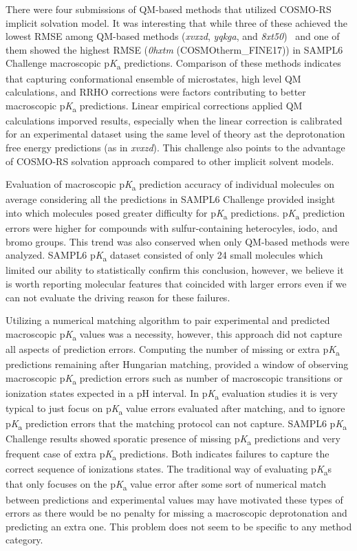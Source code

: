 \documentclass[9pt,lineno,final]{elife}
\newcommand{\pKa}{p\textit{K}\textsubscript{a}}
\begin{document}
There were four submissions of QM-based methods that utilized COSMO-RS implicit solvation model. 
It was interesting that while three of these achieved the lowest RMSE among QM-based methods (\textit{xvxzd}, \textit{yqkga}, and \textit{8xt50})~\citep{Pracht:2018:J.Comput.AidedMol.Des.} and one of them showed the highest RMSE (\textit{0hxtm} (COSMOtherm\_FINE17)) in SAMPL6 Challenge macroscopic \pKa{} predictions. Comparison of these methods indicates that capturing conformational ensemble of microstates, high level QM calculations, and RRHO corrections were factors contributing to better macroscopic \pKa{} predictions.
Linear empirical corrections applied QM calculations imporved results, especially when the linear correction is calibrated for an experimental dataset using the same level of theory  ast the deprotonation free energy predictions (as in \textit{xvxzd}).
This challenge also points to the advantage of COSMO-RS solvation approach compared to other implicit solvent models.

Evaluation of macroscopic \pKa{} prediction accuracy of individual molecules on average considering all the predictions in SAMPL6 Challenge provided insight into which molecules posed greater difficulty for \pKa{} predictions.    \pKa{} prediction errors were higher for compounds with sulfur-containing heterocyles, iodo, and bromo groups. This trend was also conserved when only QM-based methods were analyzed. SAMPL6 \pKa{} dataset consisted of only 24 small molecules which limited our ability to statistically confirm this conclusion, however, we believe it is worth reporting molecular features that coincided with larger errors even if we can not evaluate the driving reason for these failures. 

Utilizing a numerical matching algorithm to pair experimental and predicted macroscopic \pKa{} values was a necessity, however, this approach did not capture all aspects of prediction errors. Computing the number of missing or extra \pKa{} predictions remaining after Hungarian matching, provided a window of observing macroscopic \pKa{} prediction errors such as number of macroscopic transitions or ionization states expected in a pH interval. In \pKa{} evaluation studies it is very typical to just focus on \pKa{} value errors evaluated after matching, and to ignore \pKa{} prediction errors that the matching protocol can not capture. SAMPL6 \pKa{} Challenge results showed sporatic presence of missing \pKa{} predictions and very frequent case of extra \pKa{} predictions. Both indicates failures to capture the correct sequence of ionizations states. The traditional way of evaluating \pKa{}s that only focuses on the \pKa{} value error after some sort of numerical match between predictions and experimental values may have motivated these types of errors as there would be no penalty for missing a macroscopic deprotonation and predicting an extra one. This problem does not seem to be specific to any method category.
\end{document}
